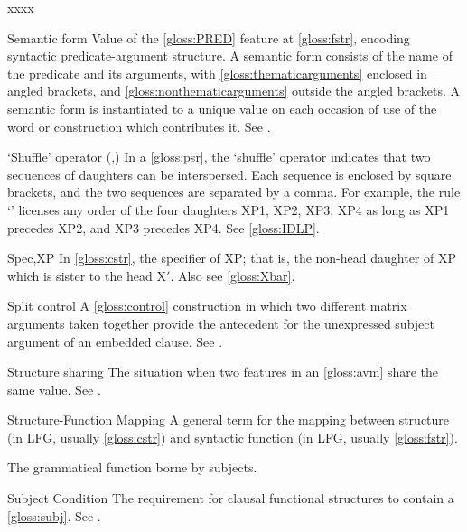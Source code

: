 \documentclass[output=paper,colorlinks,citecolor=brown]{langscibook}
\begin{document}
\begin{labeling}{xxxx}
\item[Semantic form\namedlabel{gloss:semanticform}{semantic form}\namedlabel{gloss:semanticforms}{semantic forms}] Value of the \ref{gloss:PRED} feature at \ref{gloss:fstr}, encoding syntactic predicate-argument structure.  A semantic form consists of the name of the predicate and its arguments, with \ref{gloss:thematicarguments} enclosed in angled brackets, and \ref{gloss:nonthematicarguments} outside the angled brackets. A semantic form is instantiated to a unique value on each occasion of use of the word or construction which contributes it.  See \citetv[\ref{sect:pred}]{chapters/CoreConcepts}.

\item[`Shuffle' operator (,)\namedlabel{gloss:Shuffle}{`Shuffle' operator}] In a \ref{gloss:psr}, the `shuffle' operator indicates that two sequences of daughters can be interspersed.  Each sequence is enclosed by square brackets, and the two sequences are separated by a comma.  For example, the rule \mbox{`'} licenses any order of the four daughters XP1, XP2, XP3, XP4 as long as XP1 precedes XP2, and XP3 precedes XP4.  See \ref{gloss:IDLP}.

\item[Spec,XP] In \ref{gloss:cstr}, the specifier of XP; that is, the non-head daughter of XP which is sister to the head X$'$.  Also see \ref{gloss:Xbar}.

\item[Split control\namedlabel{gloss:split}{split}] A \ref{gloss:control} construction in which two different matrix arguments taken together provide the antecedent for the unexpressed subject argument of an embedded clause. See .
  
\item[Structure sharing\namedlabel{gloss:StructureSharing}{Structure sharing}] The situation when two features in an \ref{gloss:avm} share the same value. See \citetv[\ref{sect:intro:sharing}]{chapters/Intro}.

\item[Structure-Function Mapping] A general term for the mapping between structure (in LFG, usually \ref{gloss:cstr}) and syntactic function (in LFG, usually \ref{gloss:fstr}).

\item[\SUBJ\namedlabel{gloss:subj}{\SUBJ}] The grammatical function borne by subjects.

\item[Subject Condition] The requirement for clausal functional structures to contain a \ref{gloss:subj}.  See \citetv[\ref{sect:gfs:subj}]{chapters/GFs}.


\end{labeling}
\end{document}
